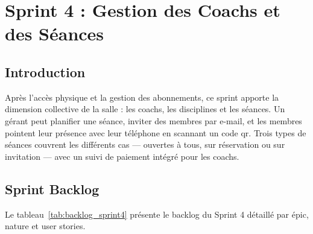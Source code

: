 ﻿\documentclass[../main.tex]{subfiles}
\begin{document}
\chapter{Sprint 4 : Gestion des Coachs et des S\'{e}ances}

\section{Introduction}

Apr\`{e}s l'acc\`{e}s physique et la gestion des abonnements, ce sprint apporte la dimension collective de la salle : les coachs, les disciplines et les s\'{e}ances. Un g\'{e}rant peut planifier une s\'{e}ance, inviter des membres par e-mail, et les membres pointent leur pr\'{e}sence avec leur t\'{e}l\'{e}phone en scannant un code \acrshort{qr}. Trois types de s\'{e}ances couvrent les diff\'{e}rents cas --- ouvertes \`{a} tous, sur r\'{e}servation ou sur invitation --- avec un suivi de paiement int\'{e}gr\'{e} pour les coachs.

\section{Sprint Backlog}

Le tableau~\ref{tab:backlog_sprint4} pr\'{e}sente le backlog du Sprint 4 d\'{e}taill\'{e} par \'{e}pic, nature et user stories.
\end{document}
